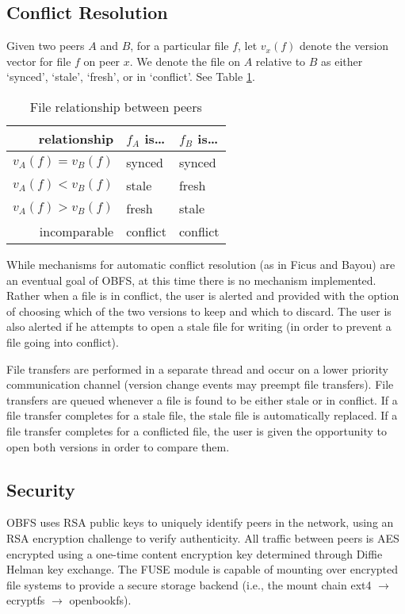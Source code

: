 \documentclass[10pt,twocolumn]{article}
\begin{document}
\subsection{Conflict Resolution}
Given two peers $A$ and $B$, for a particular file $f$, let $v_x(f)$ denote the
version vector for file $f$ on peer $x$. We denote the file on $A$ relative to
$B$ as either `synced', `stale', `fresh', or in `conflict'. See Table \ref{tbl:FileRelationship}.

\begin{table}
    \centering
    \begin{tabular}{r|l|l}
        relationship        &  $f_A$ is\ldots & $f_B$ is\ldots \\ \hline
        $v_A(f) = v_B(f)$   &  synced         & synced         \\
        $v_A(f) < v_B(f)$   &  stale          & fresh          \\
        $v_A(f) > v_B(f)$   &  fresh          & stale          \\
        incomparable        &  conflict       & conflict       
    \end{tabular}
    \caption{File relationship between peers}
	\label{tbl:FileRelationship}
\end{table}

While mechanisms for automatic conflict resolution (as in Ficus and Bayou) are
an eventual goal of OBFS, at this time there is no mechanism implemented. Rather
when a file is in conflict, the user is alerted and provided with the option of
choosing which of the two versions to keep and which to discard. The user is
also alerted if he attempts to open a stale file for writing (in order to 
prevent a file going into conflict). 

File transfers are performed in a separate thread and occur on a lower 
priority communication channel (version change events may preempt file
transfers). File transfers are queued whenever a file is found to be either
stale or in conflict. If a file transfer completes for a stale file, the stale
file is automatically replaced. If a file transfer completes for a conflicted 
file, the user is given the opportunity to open both versions in order to compare 
them. 

\subsection{Security}

OBFS uses RSA public keys to uniquely identify peers in the network, using an
RSA encryption challenge to verify authenticity. All traffic between peers is
AES encrypted using a one-time content encryption key determined through Diffie
Helman key exchange. The FUSE module is capable of mounting over encrypted file
systems to provide a secure storage backend (i.e., the mount chain ext4 
$\rightarrow$ ecryptfs $\rightarrow$ openbookfs).
\end{document}
